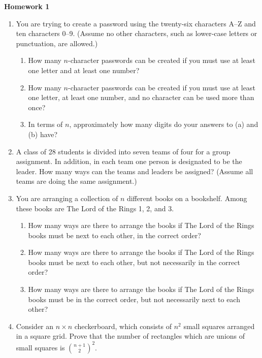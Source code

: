 \documentclass[oneside,12pt]{memoir}
\begin{document}
\begin{center}
	\textbf{\large Homework 1} \\
\end{center}

\begin{enumerate}

	\item You are trying to create a password using the twenty-six characters A--Z and ten characters 0--9. (Assume no other characters, such as lower-case letters or punctuation, are allowed.)
	      \begin{enumerate}
		      \item How many $n$-character passwords can be created if you must use at least one letter and at least one number?
		      \item How many $n$-character passwords can be created if you must use at least one letter, at least one number, and no character can be used more than once?
		      \item In terms of $n$, approximately how many digits do your answers to (a) and (b) have?
	      \end{enumerate}

	\item A class of 28 students is divided into seven teams of four for a group assignment. In addition, in each team one person is designated to be the leader. How many ways can the teams and leaders be assigned? (Assume all teams are doing the same assignment.)

	\item You are arranging a collection of $n$ different books on a bookshelf. Among these books are The Lord of the Rings 1, 2, and 3.
	      \begin{enumerate}
		      \item How many ways are there to arrange the books if The Lord of the Rings books must be next to each other, in the correct order?
		      \item How many ways are there to arrange the books if The Lord of the Rings books must be next to each other, but not necessarily in the correct order?
		      \item How many ways are there to arrange the books if The Lord of the Rings books must be in the correct order, but not necessarily next to each other?
	      \end{enumerate}

	\item Consider an $n \times n$ checkerboard, which consists of $n^2$ small squares arranged in a square grid. Prove that the number of rectangles which are unions of small squares is $\binom{n+1}{2}^2$.


\end{enumerate}
\end{document}
